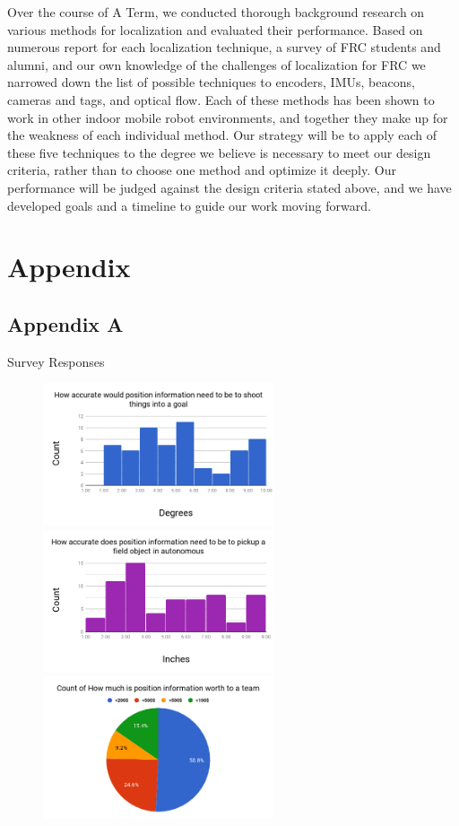 \documentclass{article}
\begin{document}
  Over the course of A Term, we conducted thorough background research on various methods for localization and evaluated their performance. Based on numerous report for each localization technique, a survey of FRC students and alumni, and our own knowledge of the challenges of localization for FRC we narrowed down the list of possible techniques to encoders, IMUs, beacons, cameras and tags, and optical flow. Each of these methods has been shown to work in other indoor mobile robot environments, and together they make up for the weakness of each individual method. Our strategy will be to apply each of these five techniques to the degree we believe is necessary to meet our design criteria, rather than to choose one method and optimize it deeply. Our performance will be judged against the design criteria stated above, and we have developed goals and a timeline to guide our work moving forward.

\section{Appendix}

  \subsection{Appendix A}\label{appendix:survey}

    Survey Responses

    \begin{figure}[H]
      \includegraphics[height=4.2cm]{./images/survey_angle.png}
      \includegraphics[height=4.2cm]{./images/survey_position.png}
      \includegraphics[height=4.2cm]{./images/survey_worth.png}
      \label{fig:survey}
    \end{figure}
\end{document}
